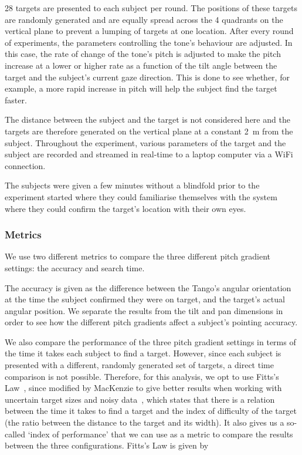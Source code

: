\documentclass[format=sigconf, review=true, screen=true, anonymous=true]{acmart}
\begin{document}
28 targets are presented to each subject per round. The positions of these targets are randomly generated and are equally spread across the 4 quadrants on the vertical plane to prevent a lumping of targets at one location. After every round of experiments, the parameters controlling the tone's behaviour are adjusted. In this case, the rate of change of the tone's pitch is adjusted to make the pitch increase at a lower or higher rate as a function of the tilt angle between the target and the subject's current gaze direction. This is done to see whether, for example, a more rapid increase in pitch will help the subject find the target faster. 

The distance between the subject and the target is not considered here and the targets are therefore generated on the vertical plane at a constant \SI{2}{\meter} from the subject. Throughout the experiment, various parameters of the target and the subject are recorded and streamed in real-time to a laptop computer via a WiFi connection.

The subjects were given a few minutes without a blindfold prior to the experiment started where they could familiarise themselves with the system where they could confirm the target's location with their own eyes.

\subsubsection{Metrics}

We use two different metrics to compare the three different pitch gradient settings: the accuracy and search time. 

The accuracy is given as the difference between the Tango's angular orientation at the time the subject confirmed they were on target, and the target's actual angular position. We separate the results from the tilt and pan dimensions in order to see how the different pitch gradients affect a subject's pointing accuracy. 


We also compare the performance of the three pitch gradient settings in terms of the time it takes each subject to find a target. However, since each subject is presented with a different, randomly generated set of targets, a direct time comparison is not possible. Therefore, for this analysis, we opt to use Fitts's Law~\cite{fitts1954information}, since modified by MacKenzie to give better results when working with uncertain target sizes and noisy data~\cite{mackenzie1992fitts}, which states that there is a relation between the time it takes to find a target and the index of difficulty of the target (the ratio between the distance to the target and its width). It also gives us a so-called `index of performance' that we can use as a metric to compare the results between the three configurations. Fitts's Law is given by  
\end{document}
